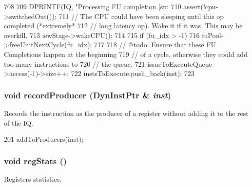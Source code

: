 \begin{DoxyCode}
708 {
709     DPRINTF(IQ, "Processing FU completion [sn:%
710     assert(!cpu->switchedOut());
711     // The CPU could have been sleeping until this op completed (*extremely*
712     // long latency op).  Wake it if it was.  This may be overkill.
713     iewStage->wakeCPU();
714 
715     if (fu_idx > -1)
716         fuPool->freeUnitNextCycle(fu_idx);
717 
718     // @todo: Ensure that these FU Completions happen at the beginning
719     // of a cycle, otherwise they could add too many instructions to
720     // the queue.
721     issueToExecuteQueue->access(-1)->size++;
722     instsToExecute.push_back(inst);
723 }
\end{DoxyCode}
\hypertarget{classInstructionQueue_ae43022d3677118a4ab40113712045f64}{
\subsubsection[{recordProducer}]{\setlength{\rightskip}{0pt plus 5cm}void recordProducer ({\bf DynInstPtr} \& {\em inst})}}
\label{classInstructionQueue_ae43022d3677118a4ab40113712045f64}
Records the instruction as the producer of a register without adding it to the rest of the IQ. 


\begin{DoxyCode}
201     { addToProducers(inst); }
\end{DoxyCode}
\hypertarget{classInstructionQueue_a4dc637449366fcdfc4e764cdf12d9b11}{
\subsubsection[{regStats}]{\setlength{\rightskip}{0pt plus 5cm}void regStats ()}}
\label{classInstructionQueue_a4dc637449366fcdfc4e764cdf12d9b11}
Registers statistics. 


